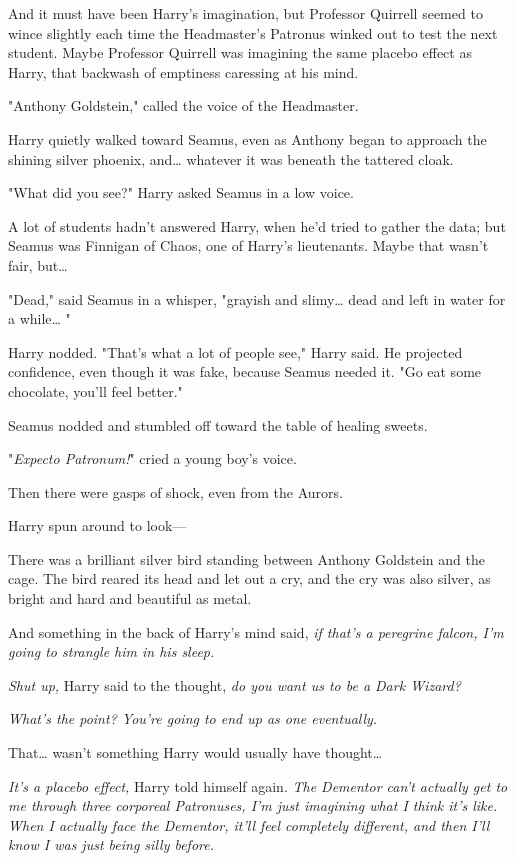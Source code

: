 And it must have been Harry's imagination, but Professor Quirrell seemed to 
wince slightly each time the Headmaster's Patronus winked out to test the next 
student. Maybe Professor Quirrell was imagining the same placebo effect as 
Harry, that backwash of emptiness caressing at his mind.

"Anthony Goldstein," called the voice of the Headmaster.

Harry quietly walked toward Seamus, even as Anthony began to approach the 
shining silver phoenix, and{\ldots} whatever it was beneath the tattered cloak.

"What did you see?" Harry asked Seamus in a low voice.

A lot of students hadn't answered Harry, when he'd tried to gather the data; 
but Seamus was Finnigan of Chaos, one of Harry's lieutenants. Maybe that wasn't 
fair, but{\ldots}

"Dead," said Seamus in a whisper, "grayish and slimy{\ldots} dead and left in 
water for a while{\ldots} "

Harry nodded. "That's what a lot of people see," Harry said. He projected 
confidence, even though it was fake, because Seamus needed it. "Go eat some 
chocolate, you'll feel better."

Seamus nodded and stumbled off toward the table of healing sweets.

"\emph{Expecto Patronum!}" cried a young boy's voice.

Then there were gasps of shock, even from the Aurors.

Harry spun around to look---

There was a brilliant silver bird standing between Anthony Goldstein and the 
cage. The bird reared its head and let out a cry, and the cry was also silver, 
as bright and hard and beautiful as metal.

And something in the back of Harry's mind said, \emph{if that's a peregrine 
falcon, I'm going to strangle him in his sleep.}

\emph{Shut up,} Harry said to the thought, \emph{do you want us to be a Dark 
Wizard?}

\emph{What's the point? You're going to end up as one eventually.}

That{\ldots} wasn't something Harry would usually have thought{\ldots}

\emph{It's a placebo effect,} Harry told himself again. \emph{The Dementor 
can't actually get to me through three corporeal Patronuses, I'm just imagining 
what I think it's like. When I actually face the Dementor, it'll feel 
completely different, and then I'll know I was just being silly before.}

